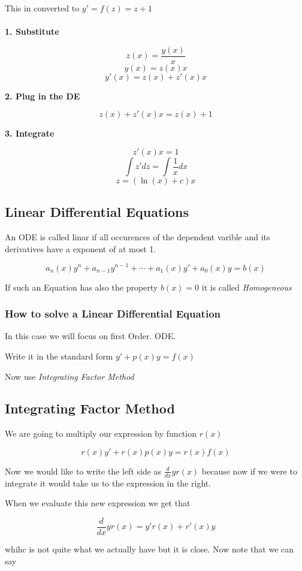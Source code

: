 This in converted to \(y' = f(z) = z + 1\)
\\\\
\textbf{1. Substitute}

\[z(x) = \frac{y(x)}{x}\]
\[y(x) = z(x)x\]
\[y'(x) = z(x) + z'(x)x\]

\textbf{2. Plug in the DE}

\[z(x) + z'(x)x = z(x) + 1\]

\textbf{3. Integrate}

\[z'(x)x = 1\]
\[\int z' dz = \int \frac{1}{x} dx\]
\[z = (\ln(x) + c)x\]

\subsection{Linear Differential Equations}

An ODE is called linar if all occurences of the dependent varible and its
derivatives have a exponent of at most 1.

\[a_n(x)y^n + a_{n - 1}y^{n -1} + \cdots + a_1(x)y' + a_0(x)y = b(x)\]

If such an Equation has also the property \(b(x) = 0\) it is called \emph{Homogeneous}

\subsubsection{How to solve a Linear Differential Equation}

In this case we will focus on first Order. ODE.

Write it in the standard form \(y' + p(x)y = f(x)\)

Now use \emph{Integrating Factor Method}

\subsection{Integrating Factor Method}

We are going to multiply our expression by function \(r(x)\) 

\[r(x)y' + r(x)p(x)y = r(x)f(x)\]

Now we would like to write the left side as \(\frac{d}{dx} y r(x)\) because now if we
were to integrate it would take us to the expression in the right.

When we evaluate this new expression we get that

\[\frac{d}{dx} y r(x) = y'r(x) + r'(x)y\]

whihc is not quite what we actually have but it is close. Now note that we can say

